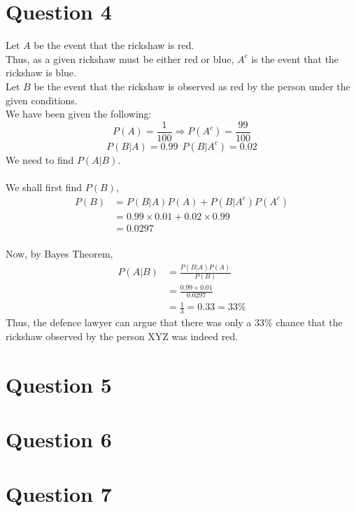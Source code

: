\documentclass[11pt]{article}
\begin{document}
\section{Question 4}
Let $A$ be the event that the rickshaw is red.\\
Thus, as a given rickshaw must be either red or blue, $A^c$ is the event that the rickshaw is blue.\\
Let $B$ be the event that the rickshaw is observed as red by the person under the given conditions.\\
We have been given the following:
$$ 
    P(A) = \frac{1}{100} \Rightarrow P(A^c) = \frac{99}{100}
$$
$$
    P(B|A) = 0.99 \ \  P(B|A^c) = 0.02
$$
We need to find $P(A|B)$. \\
\\
We shall first find $P(B)$,
$$
\begin{aligned}
    P(B) &= P(B|A)P(A) + P(B|A^c)P(A^c)\\
    &= 0.99\times0.01 + 0.02\times0.99\\
    &= 0.0297
\end{aligned}
$$
\\
Now, by Bayes Theorem,
$$
\begin{aligned}
    P(A|B) &= \frac{P(B|A)P(A)}{P(B)}\\
    &= \frac{0.99\times0.01}{0.0297}\\
    &= \frac{1}{3} = 0.33 = 33\%
\end{aligned}
$$
Thus, the defence lawyer can argue that there was only a $33\%$ chance that the rickshaw observed by the person XYZ was indeed red.

\newpage
\section{Question 5}

\newpage
\section{Question 6}

\newpage
\section{Question 7}
\end{document}
